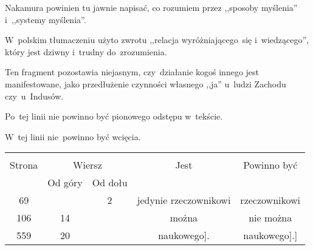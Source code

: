 \documentclass[a4paper,11pt]{article}
\begin{document}


\start {} Nakamura powinien tu jawnie napisać, co rozumiem przez
,,sposoby myślenia'' i~,,systemy myślenia''.

\vspace{\spaceFour}


\start {} W~polskim tłumaczeniu użyto zwrotu ,,relacja
wyróżniającego~się i~wiedzącego'', który jest dziwny i~trudny
do~zrozumienia.

\vspace{\spaceFour}


\start {} Ten fragment pozostawia niejasnym,
czy~działanie kogoś innego jest manifestowane, jako przedłużenie
czynności własnego ,,ja'' u~ludzi Zachodu czy~u~Indusów.

\vspace{\spaceFour}


\start {} Po~tej linii nie powinno być pionowego odstępu
w~tekście.

\vspace{\spaceFour}


\start {} W~tej linii nie~powinno być wcięcia.


\begin{center}
  \begin{tabular}{|c|c|c|c|c|}
    \hline
    & \multicolumn{2}{c|}{} & & \\
    Strona & \multicolumn{2}{c|}{Wiersz} & Jest
                              & Powinno być \\ \cline{2-3}
    & Od góry & Od dołu & & \\
    \hline
    69  & &  2 & jedynie rzeczownikowi & rzeczownikowi \\
    106 & 14 & & można & nie można \\
    559 & 20 & & naukowego]. & naukowego].] \\
    \hline
  \end{tabular}
\end{center}
\end{document}
